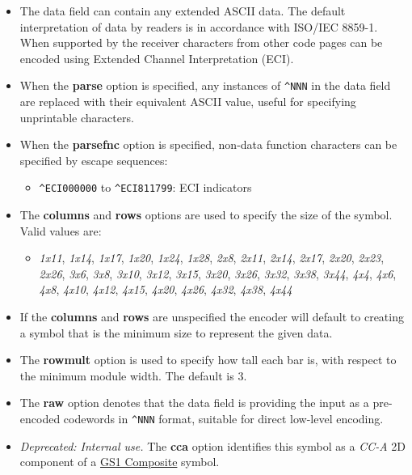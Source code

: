 \begin{itemize}
\item
  The data field can contain any extended ASCII data. The default
  interpretation of data by readers is in accordance with ISO/IEC
  8859-1. When supported by the receiver characters from other code
  pages can be encoded using Extended Channel Interpretation (ECI).
\item
  When the \textbf{parse} option is specified, any instances of
  \texttt{\^{}NNN} in the data field are replaced with their equivalent
  ASCII value, useful for specifying unprintable characters.
\item
  When the \textbf{parsefnc} option is specified, non-data function
  characters can be specified by escape sequences:

  \begin{itemize}
  \tightlist
  \item
    \texttt{\^{}ECI000000} to \texttt{\^{}ECI811799}: ECI indicators
  \end{itemize}
\item
  The \textbf{columns} and \textbf{rows} options are used to specify the
  size of the symbol. Valid values are:

  \begin{itemize}
  \tightlist
  \item
    \emph{1x11}, \emph{1x14}, \emph{1x17}, \emph{1x20}, \emph{1x24},
    \emph{1x28}, \emph{2x8}, \emph{2x11}, \emph{2x14}, \emph{2x17},
    \emph{2x20}, \emph{2x23}, \emph{2x26}, \emph{3x6}, \emph{3x8},
    \emph{3x10}, \emph{3x12}, \emph{3x15}, \emph{3x20}, \emph{3x26},
    \emph{3x32}, \emph{3x38}, \emph{3x44}, \emph{4x4}, \emph{4x6},
    \emph{4x8}, \emph{4x10}, \emph{4x12}, \emph{4x15}, \emph{4x20},
    \emph{4x26}, \emph{4x32}, \emph{4x38}, \emph{4x44}
  \end{itemize}
\item
  If the \textbf{columns} and \textbf{rows} are unspecified the encoder
  will default to creating a symbol that is the minimum size to
  represent the given data.
\item
  The \textbf{rowmult} option is used to specify how tall each bar is,
  with respect to the minimum module width. The default is 3.
\item
  The \textbf{raw} option denotes that the data field is providing the
  input as a pre-encoded codewords in \texttt{\^{}NNN} format, suitable
  for direct low-level encoding.
\item
  \emph{Deprecated: Internal use.} The \textbf{cca} option identifies
  this symbol as a \emph{CC-A} 2D component of a
  \protect\hyperlink{gs1-composite-symbols}{GS1 Composite} symbol.


\end{itemize}
